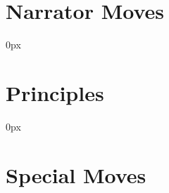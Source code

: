 \documentclass{article}
\begin{document}
\thispagestyle{empty}
\setlength\parindent{0pt}

\begin{multicols}{2}

  \begin{minipage}{0.5\textwidth}
    \section*{Narrator Moves}
    \newenvironment{narratormove}[2]
    {\item #1}
    {}
    \begin{itemize}\itemsep0px
      
    \end{itemize}
  \end{minipage}

  \begin{minipage}{0.5\textwidth}
    \section*{Principles}
    \newenvironment{principle}[2]{\item #1}{}
    \begin{itemize}\itemsep0px
      
    \end{itemize}
  \end{minipage}


\end{multicols}

\section*{Special Moves}
\newenvironment{movedef}[3]{\subsection*{#1}#2}{}

\end{document}
